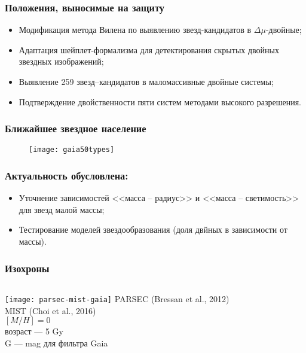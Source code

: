 \begin{frame}
   \frametitle{Положения, выносимые на защиту}
   \begin{itemize}
 		\item Модификация метода Вилена по выявлению звезд-кандидатов в $\Delta\mu$-двойные;
 		\item Адаптация шейплет-формализма для детектирования скрытых двойных звездных изображений;
 		\item Выявление 259 звезд--кандидатов в маломассивные двойные системы;
 		\item Подтверждение двойственности пяти систем методами высокого разрешения.
   \end{itemize}
\end{frame}

\begin{frame}
\frametitle{Ближайшее звездное население}
\begin{figure}[pt]
 \centering
  \texttt{[image: gaia50types]}
\end{figure}
\end{frame}

\begin{frame}
\frametitle{Актуальность обусловлена:}
\begin{itemize}
	\item Уточнение зависимостей <<масса -- радиус>> и <<масса -- светимость>> для звезд малой массы;
	\item Тестирование моделей звездообразования (доля двйных в зависимости от массы).
\end{itemize}
\end{frame}

\begin{frame}
\frametitle{Изохроны}
\begin{columns}
	\texttt{[image: parsec-mist-gaia]}
{\scriptsize PARSEC (Bressan et al., 2012)} \\
{\scriptsize MIST (Choi et al., 2016)} \\
{\scriptsize $[M/H]=0$} \\
{\scriptsize возраст --- 5 Gy} \\
{\scriptsize G --- mag для фильтра Gaia} \\
\end{columns}
\end{frame}

